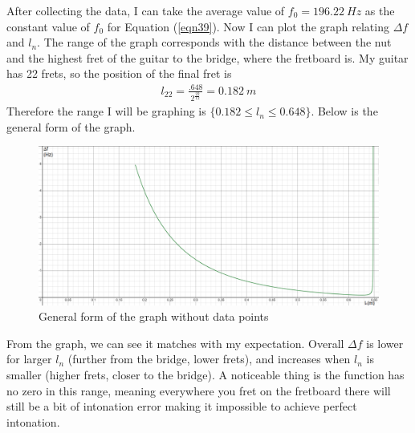 After collecting the data, I can take the average value of $f_0 = \SI{196.22}{Hz}$ as the constant value of $f_0$ for Equation (\ref{eqn39}). Now I can plot the graph relating $\Delta f$ and $l_n$. The range of the graph corresponds with the distance between the nut and the highest fret of the guitar to the bridge, where the fretboard is. My guitar has 22 frets, so the position of the final fret is
\begin{align*}
    l_{22} = \frac{.648}{2^{\frac{22}{12}}} = \SI{0.182}{m}
\end{align*} 
Therefore the range I will be graphing is $\{0.182 \le l_n \le 0.648 \}$. Below is the general form of the graph.\par
\FloatBarrier
\begin{figure}[!ht]
    \includegraphics[width = \textwidth]{./ee/no_data_graph.png}
    \caption{General form of the graph without data points} \label{fig8}
\end{figure}
\FloatBarrier
From the graph, we can see it matches with my expectation. Overall $\Delta f$ is lower for larger $l_n$ (further from the bridge, lower frets), and increases when $l_n$ is smaller (higher frets, closer to the bridge). A noticeable thing is the function has no zero in this range, meaning everywhere you fret on the fretboard there will still be a bit of intonation error making it impossible to achieve perfect intonation.\par
